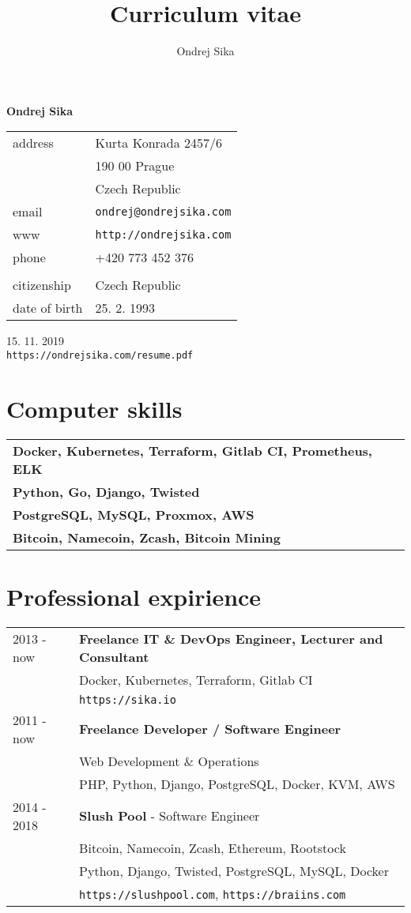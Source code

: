 \documentclass[12pt,a4paper]{article}
\title{Curriculum vitae}
\author{Ondrej Sika}
\begin{document}
\begin{center}
{\LARGE \bf Ondrej Sika}\\
\vspace*{0.2cm}
\begin{tabular}{R{5cm}L{5cm}}
address & Kurta Konrada 2457/6\\
 & 190 00 Prague\\
 & Czech Republic\\
email & \texttt{ondrej@ondrejsika.com}\\
www & \texttt{http://ondrejsika.com}\\
phone & +420 773 452 376\\
\\
citizenship & Czech Republic\\
date of birth & 25. 2. 1993\\
\end{tabular}

\vspace*{0.3cm}
{\hfill 15. 11. 2019}\\
{\hfill \texttt{https://ondrejsika.com/resume.pdf}}
\end{center}

\section*{Computer skills}
\begin{tabular}{@{}ll}
{\bf Docker, Kubernetes, Terraform, Gitlab CI, Prometheus, ELK} & \\
{\bf Python, Go, Django, Twisted} & \\
{\bf PostgreSQL, MySQL, Proxmox, AWS} & \\
{\bf Bitcoin, Namecoin, Zcash, Bitcoin Mining} & \\
\end{tabular}

\section*{Professional expirience}
\begin{tabular}{@{}p{2cm}l}
2013 - now & {\bf Freelance IT \& DevOps Engineer, Lecturer and Consultant }\\
 & Docker, Kubernetes, Terraform, Gitlab CI\\
 & \texttt{https://sika.io}\\
2011 - now & {\bf Freelance Developer / Software Engineer}\\
 & Web Development \& Operations\\
 & PHP, Python, Django, PostgreSQL, Docker, KVM, AWS\\
2014 - 2018 & {\bf Slush Pool} - Software Engineer\\
 & Bitcoin, Namecoin, Zcash, Ethereum, Rootstock\\
 & Python, Django, Twisted, PostgreSQL, MySQL, Docker\\
 & \texttt{https://slushpool.com}, \texttt{https://braiins.com}\\
\end{tabular}
\end{document}

